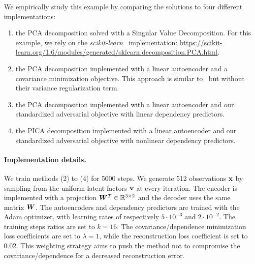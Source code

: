 We empirically study this example by comparing the solutions to four different implementations:
\begin{enumerate}
    \item the PCA decomposition solved with a Singular Value Decomposition. For this example, we rely on the \textit{scikit-learn}~\citep{scikit-learn} implementation: \url{https://scikit-learn.org/1.6/modules/generated/sklearn.decomposition.PCA.html}.
    \item the PCA decomposition implemented with a linear autoencoder and a covariance minimization objective. This approach is similar to~\cite{mialon2022vcreg} but without their variance regularization term. 
    \item the PCA decomposition implemented with a linear autoencoder and our standardized adversarial objective with linear dependency predictors. 
    \item the PICA decomposition implemented with a linear autoencoder and our standardized adversarial objective with nonlinear dependency predictors. 
\end{enumerate}

\paragraph{Implementation details.} 
We train methods (2) to (4) for 5000 steps. We generate 512 observations ${\mathbf{x}}$ by sampling from the uniform latent factors ${\mathbf{v}}$ at every iteration. 
The encoder is implemented with a projection ${\bm{W}}^T \in \mathbb{R}^{3 \times 2}$ and the decoder uses the same matrix ${\bm{W}}$. The autoencoders and dependency predictors are trained with the Adam optimizer, with learning rates of respectively $5 \cdot 10^{-3}$ and $2 \cdot 10^{-2}$. The training steps ratios are set to $k=16$. 
The covariance/dependence minimization loss coefficients are set to $\lambda=1$, while the reconstruction loss coefficient is set to 0.02. This weighting strategy aims to push the method not to compromise the covariance/dependence for a decreased reconstruction error.  

